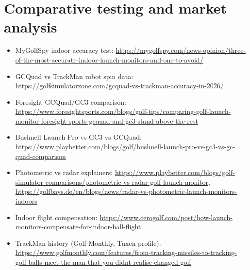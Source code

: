 \section{Comparative testing and market analysis}
\begin{itemize}\small
\item MyGolfSpy indoor accuracy test:
  \url{https://mygolfspy.com/news-opinion/three-of-the-most-accurate-indoor-launch-monitors-and-one-to-avoid/}
\item GCQuad vs TrackMan robot spin data:
  \url{https://golfsimulatorzone.com/gcquad-vs-trackman-accuracy-in-2026/}
\item Foresight GCQuad/GC3 comparison:
  \url{https://www.foresightsports.com/blogs/golf-tips/comparing-golf-launch-monitor-foresight-sports-gcquad-and-gc3-stand-above-the-rest}
\item Bushnell Launch Pro vs GC3 vs GCQuad:
  \url{https://www.playbetter.com/blogs/golf/bushnell-launch-pro-vs-gc3-vs-gc-quad-comparison}
\item Photometric vs radar explainers:
  \url{https://www.playbetter.com/blogs/golf-simulator-comparisons/photometric-vs-radar-golf-launch-monitor},
  \url{https://golfbays.de/en/blogs/news/radar-vs-photometric-launch-monitors-indoors}
\item Indoor flight compensation:
  \url{https://www.cerogolf.com/post/how-launch-monitors-compensate-for-indoor-ball-flight}
\item TrackMan history (Golf Monthly, Tuxen profile):
  \url{https://www.golfmonthly.com/features/from-tracking-missiles-to-tracking-golf-balls-meet-the-man-that-you-didnt-realise-changed-golf}
\end{itemize}
